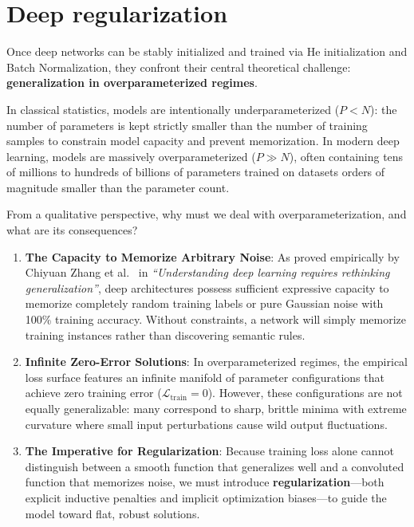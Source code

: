 \section{Deep regularization}
\label{sec:deep_regularization_generalization}

Once deep networks can be stably initialized and trained via He initialization and Batch Normalization, they confront their central theoretical challenge: \textbf{generalization in overparameterized regimes}.

In classical statistics, models are intentionally underparameterized ($P < N$): the number of parameters is kept strictly smaller than the number of training samples to constrain model capacity and prevent memorization. In modern deep learning, models are massively overparameterized ($P \gg N$), often containing tens of millions to hundreds of billions of parameters trained on datasets orders of magnitude smaller than the parameter count.

From a qualitative perspective, why must we deal with overparameterization, and what are its consequences?
\begin{enumerate}[leftmargin=*]
  \item \textbf{The Capacity to Memorize Arbitrary Noise}: As proved empirically by Chiyuan Zhang et al.~\cite{zhang2017understanding} in \textit{``Understanding deep learning requires rethinking generalization''}, deep architectures possess sufficient expressive capacity to memorize completely random training labels or pure Gaussian noise with 100\% training accuracy. Without constraints, a network will simply memorize training instances rather than discovering semantic rules.
  \item \textbf{Infinite Zero-Error Solutions}: In overparameterized regimes, the empirical loss surface features an infinite manifold of parameter configurations that achieve zero training error ($\mathcal{L}_{\text{train}} = 0$). However, these configurations are not equally generalizable: many correspond to sharp, brittle minima with extreme curvature where small input perturbations cause wild output fluctuations.
  \item \textbf{The Imperative for Regularization}: Because training loss alone cannot distinguish between a smooth function that generalizes well and a convoluted function that memorizes noise, we must introduce \textbf{regularization}---both explicit inductive penalties and implicit optimization biases---to guide the model toward flat, robust solutions.
\end{enumerate}

